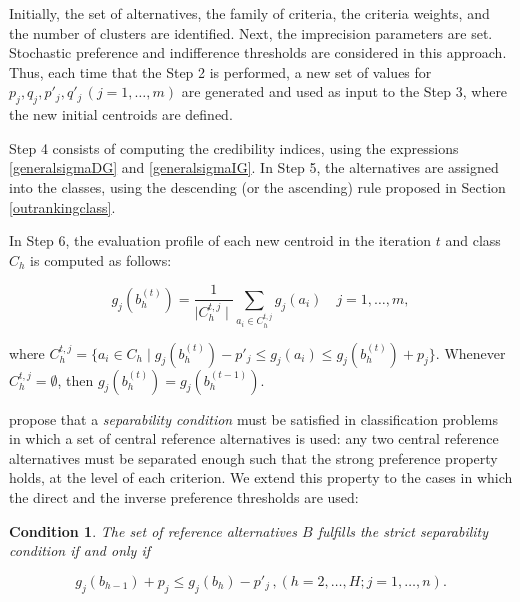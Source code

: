 \documentclass[]{elsarticle}
\theoremstyle{definition}
\newtheorem{cond}{Condition}
\begin{document}
Initially, the set of alternatives, the family of criteria, the criteria weights, and the number of clusters are identified.  Next, the imprecision parameters are set. Stochastic preference and indifference thresholds are considered in this approach. Thus, each time that the Step 2 is performed, a new set of values for $p_j,q_j,p'_j,q'_j \,(j=1,\ldots,m)$ are generated and used as input to the Step 3, where the new initial centroids are defined. 

%
%


Step 4 consists of computing the credibility indices, using the expressions \eqref{generalsigmaDG} and  \eqref{generalsigmaIG}. In Step 5, the alternatives are assigned into the classes, using the descending (or the ascending) rule proposed in Section \ref{outrankingclass}.

In Step 6, the evaluation profile of each new centroid in the iteration $t$ and class $C_h$ is computed as follows:

\begin{equation}
g_j(b_h^{(t)}) = \frac{1}{\mid C_h^{t,j} \mid} \sum_{a_i \in C_h^{t,j}} g_j(a_i) \quad j=1,\ldots,m,\label{newcentroid}
\end{equation}

\noindent
where $C_h^{t,j}=\{a_i \in C_h \mid g_j(b_h^{(t)})-p'_j\leq g_j(a_i) \leq g_j(b_h^{(t)})+p_j\}$.  Whenever $C_h^{t,j}=\emptyset$, then $g_j(b_h^{(t)})=g_j(b_h^{(t-1)})$.   


\cite{roy2012} propose that a \emph{separability condition} must be satisfied in classification problems in which a set of central reference alternatives is used: any two central reference alternatives must be separated enough such that the strong preference property holds, at the level of each criterion. We extend this property to the cases in which the direct and the inverse preference thresholds are used:

\begin{cond}
\emph{The set of reference alternatives $B$ fulfills the strict separability condition if and only if}

\begin{equation}
g_j(b_{h-1})+p_j \leq g_j(b_h)-p'_j \,,(h=2,\ldots,H; j=1,\ldots,n). \label{separability}
\end{equation}

\end{cond}
\end{document}
